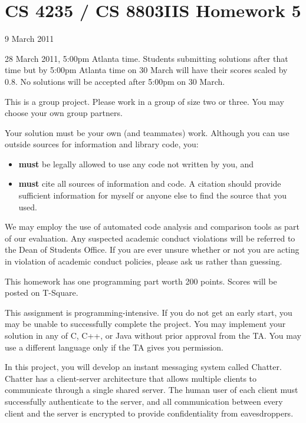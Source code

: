 \documentclass[letterpaper]{article}
\title{}
\date{}
\begin{document}
\thispagestyle{empty}

\section*{CS 4235 / CS 8803IIS Homework 5}

 9 March 2011

 28 March 2011, 5:00pm Atlanta time. Students submitting solutions after that time but by 5:00pm Atlanta time on 30 March will have their scores scaled by 0.8. No solutions will be accepted after 5:00pm on 30 March.

 This is a group project. Please work in a group of size two or three. You may choose your own group partners.

\bigskip\noindent
Your solution must be your own (and teammates) work. Although you can use
outside sources for information and library code, you:
\begin{itemize}
\item {\bf must} be legally allowed to use any code not written by you, and
\item {\bf must} cite all sources of information and code. A citation should provide
sufficient information for myself or anyone else to find the source that you
used.
\end{itemize}
We may employ the use of automated code analysis and comparison tools as part of
our evaluation. Any suspected academic conduct violations will be referred to the
Dean of Students Office. If you are ever unsure whether or not you are acting in
violation of academic conduct policies, please ask us rather than guessing.

This homework has one programming part worth 200 points. Scores will be posted on T-Square.

\bigskip\noindent
This assignment is programming-intensive. If you do not get an early start, you may
be unable to successfully complete the project. You may implement your solution in
any of C, C++, or Java without prior approval from the TA. You may use a different
language only if the TA gives you permission.

In this project, you will develop an instant messaging system called Chatter. Chatter
has a client-server architecture that allows multiple clients to communicate through
a single shared server. The human user of each client must successfully authenticate
to the server, and all communication between every client and the server is
encrypted to provide confidentiality from eavesdroppers.
\end{document}
